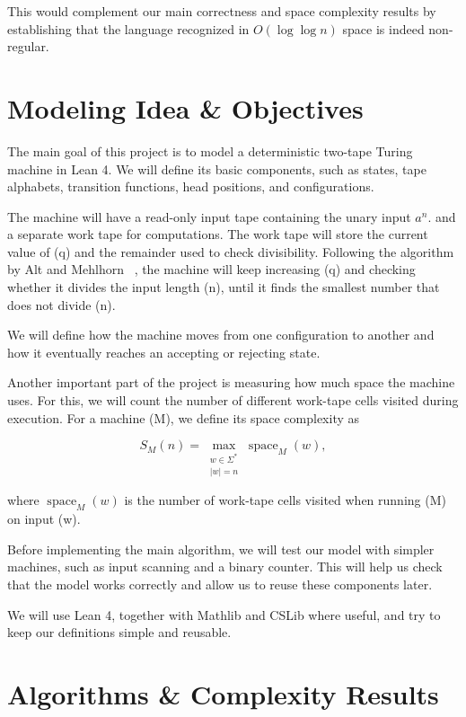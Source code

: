 \documentclass[UTF8]{article}
\begin{document}
This would complement our main correctness and space
complexity results by establishing that the language
recognized in $O(\log\log n)$ space is indeed non-regular.


\section{Modeling Idea \& Objectives}

The main goal of this project is to model a deterministic two-tape Turing machine in Lean 4.
We will define its basic components, such as states, tape alphabets, transition functions, head positions, and configurations.

The machine will have a read-only input tape containing the unary input $a^n$. and a separate work tape for computations.
The work tape will store the current value of (q) and the remainder used to check divisibility.
Following the algorithm by Alt and Mehlhorn ~\cite{Lang-OneSymbAlph-LogLogn-HM-1975}, the machine will keep increasing (q) and checking whether it divides the input length (n), until it finds the smallest number that does not divide (n).

We will define how the machine moves from one configuration to another and how it eventually reaches an accepting or rejecting state.

Another important part of the project is measuring how much space the machine uses. For this, we will count the number of different work-tape cells visited during execution. For a machine (M), we define its space complexity as

\[
S_M(n)=
\max_{\substack{w\in\Sigma^*\\|w|=n}}
\operatorname{space}_M(w),
\]

where $\operatorname{space}_M(w)$ is the number of work-tape cells visited when running (M) on input (w).

Before implementing the main algorithm, we will test our model with simpler machines, such as input scanning and a binary counter.
This will help us check that the model works correctly and allow us to reuse these components later.

We will use Lean 4, together with Mathlib and CSLib where useful, and try to keep our definitions simple and reusable.

\section{Algorithms \& Complexity Results}
\end{document}
